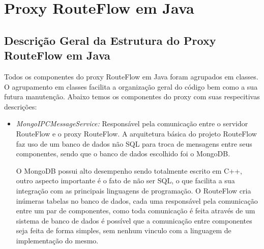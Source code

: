 \chapter{Proxy RouteFlow em Java}

\section{Descrição Geral da Estrutura do Proxy RouteFlow em Java}

Todos os componentes do proxy RouteFlow em Java foram agrupados em classes. O agrupamento em classes 
facilita a 
organização geral do código bem como a sua futura manutenção. Abaixo temos os componentes do proxy com 
suas respecitivas descrições:

\begin{itemize}
\item \textit{MongoIPCMessageService:} Responsável pela
 comunicação entre o servidor RouteFlow e o proxy 
RouteFlow. A arquitetura básica do projeto RouteFlow 
faz uso de um banco de dados não SQL para troca de 
mensagens entre seus componentes, sendo que o banco 
de dados escolhido foi o MongoDB. 

O MongoDB possui 
alto desempenho sendo totalmente escrito em C++, outro
 aspecto importante é o fato de não ser SQL, o 
que facilita a sua integração com as  principais linguagens
 de programação. 
O RouteFlow cria inúmeras tabelas no banco de dados, cada uma 
responsável pela comunicação entre um par 
de componentes, como toda comunicação é feita através de um 
sistema de banco de dados é possível que a 
comunicação entre componentes seja feita de forma simples, sem 
nenhum vinculo com a linguagem de 
implementação do mesmo. 


\end{itemize}
